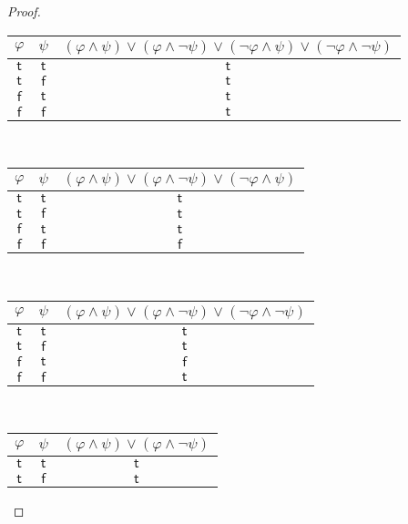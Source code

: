 \documentclass[12pt]{article}
\begin{document}
\begin{proof}
    \begin{center}
        \begin{tabular}{cc|c}
            $\varphi$ & $\psi$ & $(\varphi \land \psi) \lor (\varphi \land \neg \psi) \lor (\neg \varphi \land \psi) \lor (\neg \varphi \land \neg \psi)$ \\ \hline
            $\mathsf{t}$ & $\mathsf{t}$ & $\mathsf{t}$ \\
            $\mathsf{t}$ & $\mathsf{f}$ & $\mathsf{t}$ \\
            $\mathsf{f}$ & $\mathsf{t}$ & $\mathsf{t}$ \\
            $\mathsf{f}$ & $\mathsf{f}$ & $\mathsf{t}$ \\
        \end{tabular}
        ~~
        \begin{tabular}{cc|c}
            $\varphi$ & $\psi$ & $(\varphi \land \psi) \lor (\varphi \land \neg \psi) \lor (\neg \varphi \land \psi)$ \\ \hline
            $\mathsf{t}$ & $\mathsf{t}$ & $\mathsf{t}$ \\
            $\mathsf{t}$ & $\mathsf{f}$ & $\mathsf{t}$ \\
            $\mathsf{f}$ & $\mathsf{t}$ & $\mathsf{t}$ \\
            $\mathsf{f}$ & $\mathsf{f}$ & $\mathsf{f}$ \\
        \end{tabular}
        ~~
        \begin{tabular}{cc|c}
            $\varphi$ & $\psi$ & $(\varphi \land \psi) \lor (\varphi \land \neg \psi) \lor (\neg \varphi \land \neg \psi)$ \\ \hline
            $\mathsf{t}$ & $\mathsf{t}$ & $\mathsf{t}$ \\
            $\mathsf{t}$ & $\mathsf{f}$ & $\mathsf{t}$ \\
            $\mathsf{f}$ & $\mathsf{t}$ & $\mathsf{f}$ \\
            $\mathsf{f}$ & $\mathsf{f}$ & $\mathsf{t}$ \\
        \end{tabular}
        ~~
        \begin{tabular}{cc|c}
            $\varphi$ & $\psi$ & $(\varphi \land \psi) \lor (\varphi \land \neg \psi)$ \\ \hline
            $\mathsf{t}$ & $\mathsf{t}$ & $\mathsf{t}$ \\
            $\mathsf{t}$ & $\mathsf{f}$ & $\mathsf{t}$ \\

\end{tabular}
\end{center}
\end{proof}
\end{document}
